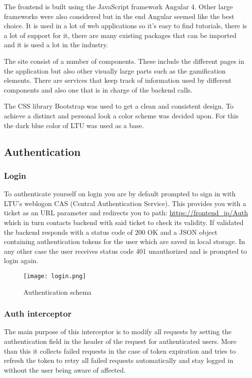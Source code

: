 The frontend is built using the JavaScript framework Angular 4. Other large frameworks were also considered but in the end Angular seemed like the best choice. It is used in a lot of web applications so it's easy to find tutorials, there is a lot of support for it, there are many existing packages that can be imported and it is used a lot in the industry.

The site consist of a number of components. These include the different pages in the application but also other visually large parts such as the gamification elements. There are services that keep track of information used by different components and also one that is in charge of the backend calls.

The CSS library Bootstrap was used to get a clean and consistent design. To achieve a distinct and personal look a color scheme was decided upon. For this the dark blue color of LTU was used as a base.

\subsection{Authentication}
\subsubsection{Login}
To authenticate yourself on login you are by default prompted to sign in with LTU's weblogon CAS (Central Authentication Service). 
This provides you with a ticket as an URL parameter and redirects you to path: \url{https://frontend\_ip/Auth} which in turn contacts backend with said ticket to check its validity. If validated the backend responds with a status code of 200 OK and a JSON object containing authentication tokens for the user which are saved in local storage. In any other case the user receives status code 401 unauthorized and is prompted to login again.
\begin{figure}[hb]
    \centering
    \texttt{[image: login.png]}
    \caption{Authentication schema}
    \label{fig:auth}
\end{figure}

\subsubsection{Auth interceptor}
The main purpose of this interceptor is to modify all requests by setting the authentication field in the header of the request for authenticated users. More than this it collects failed requests in the case of token expiration and tries to refresh the token to retry all failed requests automatically and stay logged in without the user being aware of affected.

